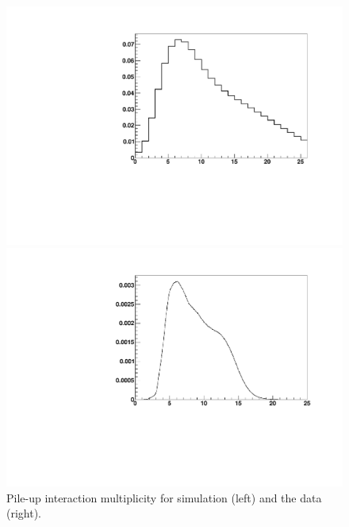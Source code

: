 \begin{figure}[ht]
  \begin{minipage}[b]{0.5\linewidth}
\centering
  \includegraphics[scale=0.35]{plots/mc_pileup.pdf}
\end{minipage}
\hspace{0.5cm}
\begin{minipage}[b]{0.5\linewidth}
\centering
  \includegraphics[scale=0.35]{plots/data_pileup.pdf}
\end{minipage}
\caption{Pile-up interaction multiplicity for simulation (left) and the data (right).}
\label{fig:interactionmultiplicity}
\end{figure}
